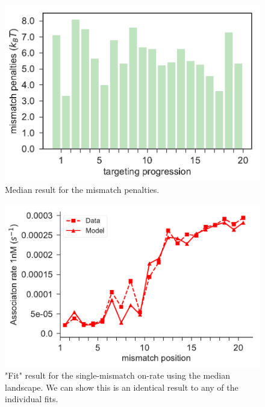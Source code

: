 \documentclass[a4paper,twoside]{revtex4-1}
\begin{document}
\begin{figure}[H]
\centering
\includegraphics[scale=0.5]{fig6_15_11_2018.pdf}
\caption{Median result for the mismatch penalties.}
\end{figure}

\begin{figure}[H]
\centering
\includegraphics[scale=0.5]{fig7_15_11_2018.pdf}
\caption{"Fit" result for the single-mismatch on-rate using the median landscape. We can show this is an identical result to any of the individual fits.}
\end{figure}
\end{document}
